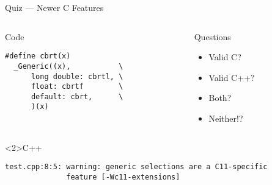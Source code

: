\documentclass[presentation,aspectratio=169]{beamer}
\begin{document}
\begin{frame}[fragile,label={sec:org23c4234}]{Quiz — Newer C Features}
 \begin{columns}
\begin{column}{0.48\columnwidth}
\begin{block}{Code}
\begin{verbatim}
#define cbrt(x)
  _Generic((x),           \
      long double: cbrtl, \
      float: cbrtf        \
      default: cbrt,      \
      )(x)
\end{verbatim}
\end{block}
\end{column}

\begin{column}{0.48\columnwidth}
\begin{block}{Questions}
\begin{itemize}
\item Valid C?
\item Valid C++?
\item Both?
\item Neither!?
\end{itemize}
\end{block}
\end{column}
\end{columns}

\begin{block}<2>{C++}
\begin{verbatim}
test.cpp:8:5: warning: generic selections are a C11-specific
              feature [-Wc11-extensions]
\end{verbatim}
\end{block}
\end{frame}

\end{document}
